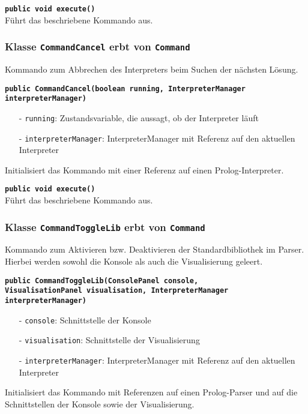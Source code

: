\documentclass[parskip=full,11pt,twoside]{scrartcl}
\begin{document}
\textbf{\texttt{public void execute()}}\\
Führt das beschriebene Kommando aus.

\subsubsection{Klasse \texttt{CommandCancel} erbt von \texttt{Command}}

Kommando zum Abbrechen des Interpreters beim Suchen der nächsten Lösung.

\textbf{\texttt{public CommandCancel(boolean running, InterpreterManager interpreterManager)}}
\begin{itemize}[noitemsep]
    \item[-] \texttt{running}: Zustandsvariable, die aussagt, ob der Interpreter läuft
	\item[-] \texttt{interpreterManager}: InterpreterManager mit Referenz auf den aktuellen Interpreter
\end{itemize}
Initialisiert das Kommando mit einer Referenz auf einen Prolog-Interpreter.

\textbf{\texttt{public void execute()}}\\
Führt das beschriebene Kommando aus.

\subsubsection{Klasse \texttt{CommandToggleLib} erbt von \texttt{Command}}

Kommando zum Aktivieren bzw. Deaktivieren der Standardbibliothek im Parser. Hierbei werden sowohl die Konsole als auch die Visualisierung geleert.

\textbf{\texttt{public CommandToggleLib(ConsolePanel console,\\VisualisationPanel visualisation, InterpreterManager interpreterManager)}}
\begin{itemize}[noitemsep]
	\item[-] \texttt{console}: Schnittstelle der Konsole
	\item[-] \texttt{visualisation}: Schnittstelle der Visualisierung
	\item[-] \texttt{interpreterManager}: InterpreterManager mit Referenz auf den aktuellen Interpreter
\end{itemize}
Initialisiert das Kommando mit Referenzen auf einen Prolog-Parser und auf die Schnittstellen der Konsole sowie der Visualisierung.
\end{document}

